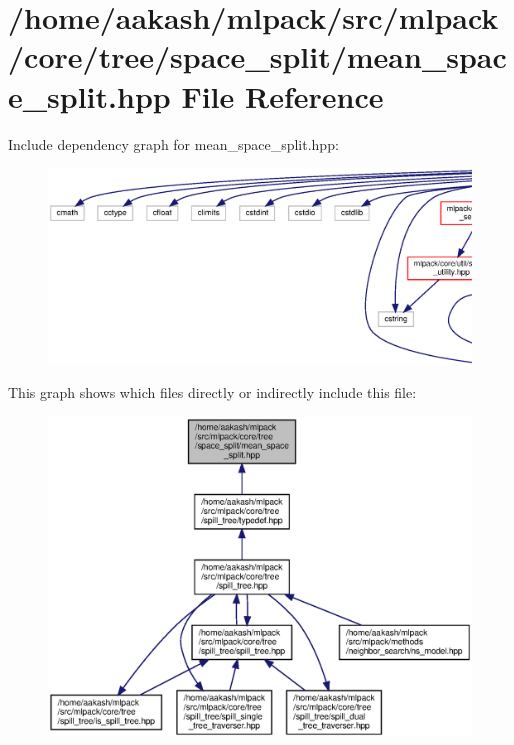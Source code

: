 \section{/home/aakash/mlpack/src/mlpack/core/tree/space\+\_\+split/mean\+\_\+space\+\_\+split.hpp File Reference}
\label{mean__space__split_8hpp}
Include dependency graph for mean\+\_\+space\+\_\+split.\+hpp\+:
\nopagebreak
\begin{figure}[H]
\begin{center}
\leavevmode
\includegraphics[width=350pt]{mean__space__split_8hpp__incl}
\end{center}
\end{figure}
This graph shows which files directly or indirectly include this file\+:
\nopagebreak
\begin{figure}[H]
\begin{center}
\leavevmode
\includegraphics[width=350pt]{mean__space__split_8hpp__dep__incl}
\end{center}
\end{figure}
